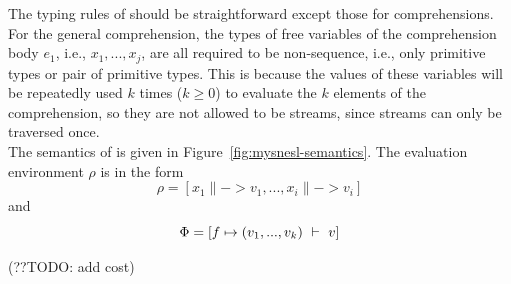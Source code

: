 The typing rules of \mysnesl should be straightforward except those for comprehensions. 
For the general comprehension, the types of free variables of the comprehension body $e_1$, i.e., $x_1,...,x_j$, are all required 
to be non-sequence, i.e., only primitive types or pair of primitive types.
This is because the values of these variables will be repeatedly used $k$ times ($k \ge 0$) to evaluate the $k$ elements of the comprehension,
so they are not allowed to be streams, since streams can only be traversed once. \\


The semantics of \mysnesl is given in Figure~\ref{fig:mysnesl-semantics}. The evaluation environment  $\rho$ is in the form $$ \rho = [x_1 \|-> v_1,...,x_i \|-> v_i]$$ and $$\Phi = [f \|-> (v_1,...,v_k) \Env v]$$

 (??TODO: add cost) \\


